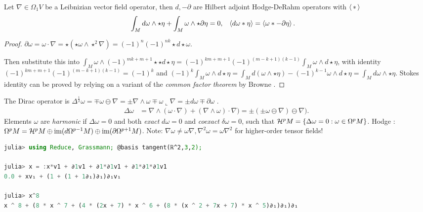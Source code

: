 \documentclass{juliacon}
\begin{document}
\begin{theorem}
	Let $ \nabla \in\Omega_1 V $ be a Leibnizian vector field operator, then $d,-\partial$ are Hilbert adjoint Hodge-DeRahm operators with $\left\langle \,\ast\, \right\rangle$
	\begin{align*}
		\int_M d\omega\wedge\star\eta +\int_M \omega\wedge\star\partial\eta &= 0, & \left\langle d\omega\ast\eta \right\rangle &=\left\langle \omega\ast-\partial\eta \right\rangle.
	\end{align*}
\end{theorem}
\begin{proof}
	$\partial\omega = \omega\cdot\nabla = \star(\star\omega\wedge\star^2\nabla) = (-1)^n(-1)^{nk}\star d\star\omega$.


	Then  substitute this into $\int_M \omega\wedge(-1)^{mk+m+1}\star\star d\star\eta = (-1)^{km+m+1}(-1)^{(m-k+1)(k-1)}\int_M\omega\wedge d\star\eta$,
	with identity $(-1)^{km+m+1}(-1)^{(m-k+1)(k-1)}=(-1)^k$ and
	$ (-1)^k\int_M\omega\wedge d\star\eta = \int_M d(\omega\wedge\star\eta) - (-1)^{k-1}\omega\wedge d\star\eta = \int_M d\omega\wedge\star\eta$.
	Stokes identity can be proved by relying on a variant of the \textit{common factor theorem} by Browne \cite{browne}.
\end{proof}
\begin{theorem}
	The Dirac operator is $ \Delta^\frac12\omega = \mp\omega\ominus\nabla = \pm\nabla\wedge\omega \mp \omega\llcorner\nabla  = \pm d\omega\mp\partial\omega$ \cite{garling}.
	\begin{align*}
		\Delta\omega &= \nabla\wedge(\omega\cdot\nabla) + (\nabla\wedge\omega)\cdot\nabla) = \pm(\pm\omega\ominus\nabla)\ominus\nabla).
	\end{align*}
	Elements $\omega$ are \textit{harmonic} if $\Delta\omega = 0$ and both \textit{exact} $d\omega=0$ and \textit{coexact} $\delta\omega=0$, such that $\mathcal{H}^p M = \left\{ \Delta\omega = 0 : \omega\in \Omega^pM \right\}$.
	Hodge \cite{ivancevic}:
	$\Omega^pM=\mathcal{H}^pM\oplus\text{im}(d\Omega^{p-1}M)\oplus\text{im}(\partial\Omega^{p+1}M)$.
	Note: $\nabla\omega\neq\omega\nabla, \nabla^2\omega=\omega\nabla^2$ for higher-order tensor fields!
\end{theorem}

\begin{lstlisting}[language = Julia]
julia> using Reduce, Grassmann; @basis tangent(ℝ^2,3,2);

julia> x = :x*v1 + ∂1v1 + ∂1*∂1v1 + ∂1*∂1*∂1v1
0.0 + xv₁ + (1 + (1 + 1∂₁)∂₁)∂₁v₁

julia> x^8
x ^ 8 + (8 * x ^ 7 + (4 * (2x + 7) * x ^ 6 + (8 * (x ^ 2 + 7x + 7) * x ^ 5)∂₁)∂₁)∂₁
\end{lstlisting}
\end{document}

